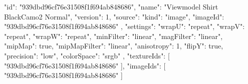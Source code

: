 {
  "id": "939dbd96cf76e31508f1f694ab848686",
  "name": "Viewmodel Shirt BlackCamo2 Normal",
  "version": 1,
  "source": {
    "kind": "image",
    "imageId": "939dbd96cf76e31508f1f694ab848686"
  },
  "settings": {
    "wrapU": "repeat",
    "wrapV": "repeat",
    "wrapW": "repeat",
    "minFilter": "linear",
    "magFilter": "linear",
    "mipMap": true,
    "mipMapFilter": "linear",
    "anisotropy": 1,
    "flipY": true,
    "precision": "low",
    "colorSpace": "srgb"
  },
  "textureIds": [
    "939dbd96cf76e31508f1f694ab848686"
  ],
  "imageIds": [
    "939dbd96cf76e31508f1f694ab848686"
  ]
}
